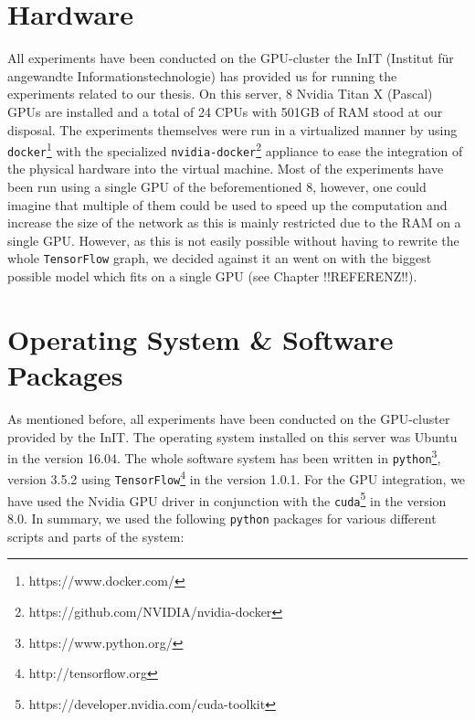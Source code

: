 \section{Hardware}
\label{software_system:hardware}
All experiments have been conducted on the GPU-cluster the InIT (Institut für angewandte Informationstechnologie) has provided us for running the experiments related to our thesis. On this server, 8 Nvidia Titan X (Pascal) GPUs are installed and a total of 24 CPUs with 501GB of RAM stood at our disposal. The experiments themselves were run in a virtualized manner by using \texttt{docker}\footnote{https://www.docker.com/} with the specialized \texttt{nvidia-docker}\footnote{https://github.com/NVIDIA/nvidia-docker} appliance to ease the integration of the physical hardware into the virtual machine. Most of the experiments have been run using a single GPU of the beforementioned 8, however, one could imagine that multiple of them could be used to speed up the computation and increase the size of the network as this is mainly restricted due to the RAM on a single GPU. However, as this is not easily possible without having to rewrite the whole \texttt{TensorFlow} graph, we decided against it an went on with the biggest possible model which fits on a single GPU (see Chapter !!REFERENZ!!).

\section{Operating System \& Software Packages}
\label{software_system:software_packages}
As mentioned before, all experiments have been conducted on the GPU-cluster provided by the InIT. The operating system installed on this server was Ubuntu in the version 16.04. The whole software system has been written in \texttt{python}\footnote{https://www.python.org/}, version 3.5.2 using \texttt{TensorFlow}\footnote{http://tensorflow.org} in the version 1.0.1. For the GPU integration, we have used the Nvidia GPU driver in conjunction with the \texttt{cuda}\footnote{https://developer.nvidia.com/cuda-toolkit} in the version 8.0. In summary, we used the following \texttt{python} packages for various different scripts and parts of the system:

